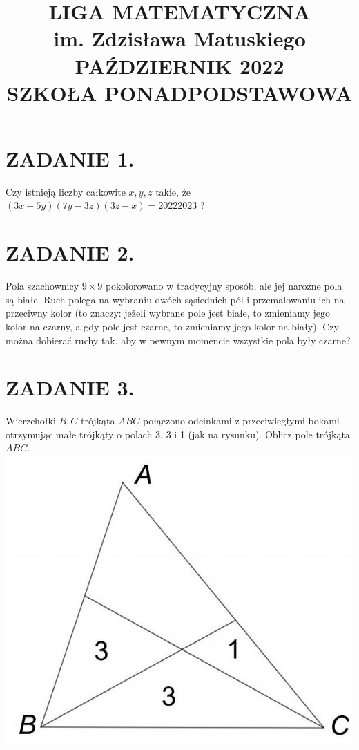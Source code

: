 \documentclass[10pt]{article}
\title{LIGA MATEMATYCZNA \\
 im. Zdzisława Matuskiego \\
 PAŹDZIERNIK 2022 \\
 SZKOŁA PONADPODSTAWOWA }
\author{}
\date{}
\begin{document}
\maketitle
\section*{ZADANIE 1.}
Czy istnieją liczby całkowite \(x, y, z\) takie, że \((3 x-5 y)(7 y-3 z)(3 z-x)=20222023\) ?

\section*{ZADANIE 2.}
Pola szachownicy \(9 \times 9\) pokolorowano w tradycyjny sposób, ale jej narożne pola są białe. Ruch polega na wybraniu dwóch sąsiednich pól i przemalowaniu ich na przeciwny kolor (to znaczy: jeżeli wybrane pole jest białe, to zmieniamy jego kolor na czarny, a gdy pole jest czarne, to zmieniamy jego kolor na biały). Czy można dobierać ruchy tak, aby w pewnym momencie wszystkie pola były czarne?

\section*{ZADANIE 3.}
Wierzchołki \(B, C\) trójkąta \(A B C\) połączono odcinkami z przeciwległymi bokami otrzymując małe trójkąty o polach 3, 3 i 1 (jak na rysunku). Oblicz pole trójkąta \(A B C\).\\
\includegraphics[max width=\textwidth, center]{2024_11_21_d499c641a0cc5271d18dg-1}
\end{document}
